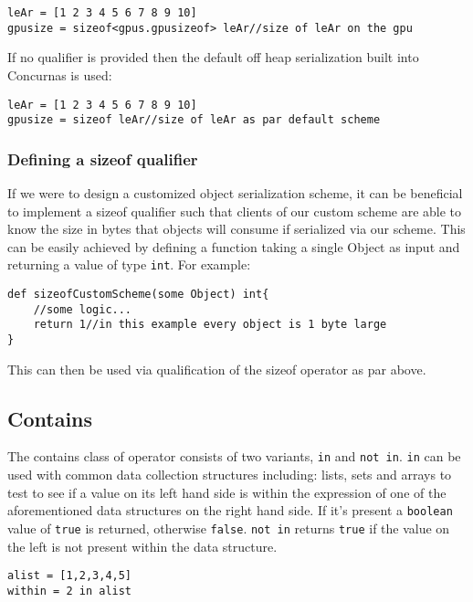 \documentclass[conc-doc]{subfiles}
\begin{document}
\begin{lstlisting}
leAr = [1 2 3 4 5 6 7 8 9 10]
gpusize = sizeof<gpus.gpusizeof> leAr//size of leAr on the gpu
\end{lstlisting}

If no qualifier is provided then the default off heap serialization built into Concurnas is used:

\begin{lstlisting}
leAr = [1 2 3 4 5 6 7 8 9 10]
gpusize = sizeof leAr//size of leAr as par default scheme
\end{lstlisting}

\subsubsection{Defining a sizeof qualifier}
If we were to design a customized object serialization scheme, it can be beneficial to implement a sizeof qualifier such that clients of our custom scheme are able to know the size in bytes that objects will consume if serialized via our scheme. This can be easily achieved by defining a function taking a single Object as input and returning a value of type \lstinline{int}. For example:

\begin{lstlisting}
def sizeofCustomScheme(some Object) int{
	//some logic...
	return 1//in this example every object is 1 byte large
}
\end{lstlisting}

This can then be used via qualification of the sizeof operator as par above.

\subsection{Contains}
The contains class of operator consists of two variants, \lstinline{in} and \lstinline{not in}. \lstinline{in} can be used with common data collection structures including: lists, sets and arrays to test to see if a value on its left hand side is within the expression of one of the aforementioned data structures on the right hand side. If it's present a \lstinline{boolean} value of \lstinline{true} is returned, otherwise \lstinline{false}. \lstinline{not in} returns \lstinline{true} if the value on the left is not present within the data structure.

\begin{lstlisting}
alist = [1,2,3,4,5]
within = 2 in alist
\end{lstlisting}
\end{document}
